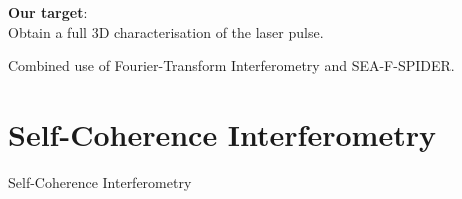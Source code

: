 \documentclass[11pt]{beamer}
\begin{document}
\begin{frame}
\textbf{Our target}:\\
Obtain a full 3D characterisation of the laser pulse.

Combined use of Fourier-Transform Interferometry and SEA-F-SPIDER.
\end{frame}

\section{Self-Coherence Interferometry}
\begin{frame}{Self-Coherence Interferometry}

\begin{parcolumns}{2}
\end{parcolumns}
\end{frame}

\end{document}
